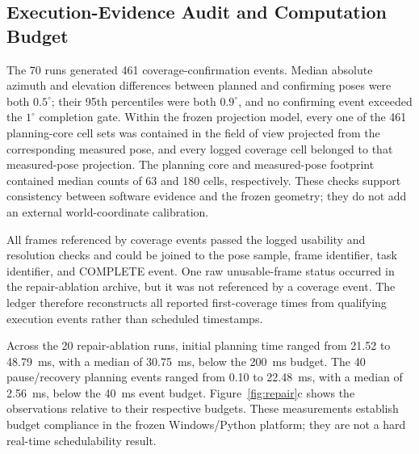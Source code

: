 \subsection{Execution-Evidence Audit and Computation Budget}

The 70 runs generated 461 coverage-confirmation events. Median absolute azimuth and elevation differences between planned and confirming poses were both $0.5^\circ$; their 95th percentiles were both $0.9^\circ$, and no confirming event exceeded the $1^\circ$ completion gate. Within the frozen projection model, every one of the 461 planning-core cell sets was contained in the field of view projected from the corresponding measured pose, and every logged coverage cell belonged to that measured-pose projection. The planning core and measured-pose footprint contained median counts of 63 and 180 cells, respectively. These checks support consistency between software evidence and the frozen geometry; they do not add an external world-coordinate calibration.

All frames referenced by coverage events passed the logged usability and resolution checks and could be joined to the pose sample, frame identifier, task identifier, and COMPLETE event. One raw unusable-frame status occurred in the repair-ablation archive, but it was not referenced by a coverage event. The ledger therefore reconstructs all reported first-coverage times from qualifying execution events rather than scheduled timestamps.

Across the 20 repair-ablation runs, initial planning time ranged from 21.52 to 48.79~ms, with a median of 30.75~ms, below the 200~ms budget. The 40 pause/recovery planning events ranged from 0.10 to 22.48~ms, with a median of 2.56~ms, below the 40~ms event budget. Figure~\ref{fig:repair}c shows the observations relative to their respective budgets. These measurements establish budget compliance in the frozen Windows/Python platform; they are not a hard real-time schedulability result.

